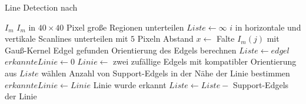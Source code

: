 \begin{algorithm}[!ht]\small
\caption{Line Detection nach \citeauthor{clarke96}}
\label{alg:linedetection-clarke-overview}
\begin{algorithmic}[1]
	\Require $I_m$
	\State $I_m$ in $40 \times 40$ Pixel große Regionen unterteilen
			\State $Liste \gets \infty$
			\State $i$ in horizontale und vertikale Scanlines unterteilen mit $5$ Pixeln Abstand
				\State $x \gets$ Falte $I_m\left(j\right)$ mit Gauß-Kernel
					\Comment Edgel gefunden
					\State Orientierung des Edgels berechnen
					\State $Liste \gets edgel$
				\EndIf
			\EndFor
				\State $erkannteLinie \gets 0$
					\State $Linie \gets$ zwei zufällige Edgels mit kompatibler Orientierung aus $Liste$ wählen
					\State Anzahl von Support-Edgels in der Nähe der Linie bestimmen
						\State $erkannteLinie \gets Linie$
					\EndIf
				\EndFor
					\Comment Linie wurde erkannt
					\State $Liste \gets Liste -$ Support-Edgels der Linie
				\EndIf
			\EndWhile
		\EndFor
	\end{algorithmic}
\end{algorithm}

